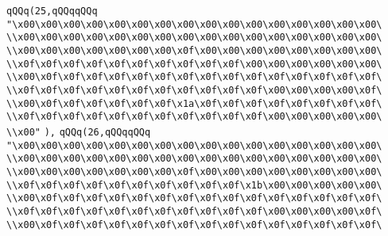 \verb|qQQq(25,qQQqqQQq|\newline
\verb|"\x00\x00\x00\x00\x00\x00\x00\x00\x00\x00\x00\x00\x00\x00\x00\x00\|\newline
\verb|\\x00\x00\x00\x00\x00\x00\x00\x00\x00\x00\x00\x00\x00\x00\x00\x00\|\newline
\verb|\\x00\x00\x00\x00\x00\x00\x00\x0f\x00\x00\x00\x00\x00\x00\x00\x00\|\newline
\verb|\\x0f\x0f\x0f\x0f\x0f\x0f\x0f\x0f\x0f\x0f\x00\x00\x00\x00\x00\x00\|\newline
\verb|\\x00\x0f\x0f\x0f\x0f\x0f\x0f\x0f\x0f\x0f\x0f\x0f\x0f\x0f\x0f\x0f\|\newline
\verb|\\x0f\x0f\x0f\x0f\x0f\x0f\x0f\x0f\x0f\x0f\x0f\x00\x00\x00\x00\x0f\|\newline
\verb|\\x00\x0f\x0f\x0f\x0f\x0f\x0f\x1a\x0f\x0f\x0f\x0f\x0f\x0f\x0f\x0f\|\newline
\verb|\\x0f\x0f\x0f\x0f\x0f\x0f\x0f\x0f\x0f\x0f\x0f\x00\x00\x00\x00\x00\|\newline
\verb|\\x00"|\newline
\verb|),|\newline
\verb|qQQq(26,qQQqqQQq|\newline
\verb|"\x00\x00\x00\x00\x00\x00\x00\x00\x00\x00\x00\x00\x00\x00\x00\x00\|\newline
\verb|\\x00\x00\x00\x00\x00\x00\x00\x00\x00\x00\x00\x00\x00\x00\x00\x00\|\newline
\verb|\\x00\x00\x00\x00\x00\x00\x00\x0f\x00\x00\x00\x00\x00\x00\x00\x00\|\newline
\verb|\\x0f\x0f\x0f\x0f\x0f\x0f\x0f\x0f\x0f\x0f\x1b\x00\x00\x00\x00\x00\|\newline
\verb|\\x00\x0f\x0f\x0f\x0f\x0f\x0f\x0f\x0f\x0f\x0f\x0f\x0f\x0f\x0f\x0f\|\newline
\verb|\\x0f\x0f\x0f\x0f\x0f\x0f\x0f\x0f\x0f\x0f\x0f\x00\x00\x00\x00\x0f\|\newline
\verb|\\x00\x0f\x0f\x0f\x0f\x0f\x0f\x0f\x0f\x0f\x0f\x0f\x0f\x0f\x0f\x0f\|\newline
